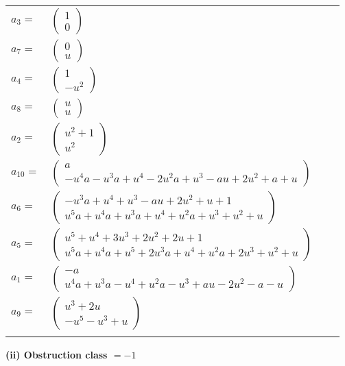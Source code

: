 \documentclass[1p]{elsarticle_modified}
\theoremstyle{definition}
\begin{document}
\begin{tabular}{m{7pt} m{180pt} m{7pt} m{180pt} }
\flushright $a_{3}=$&$\begin{pmatrix}1\\0\end{pmatrix}$ \\
\flushright $a_{7}=$&$\begin{pmatrix}0\\u\end{pmatrix}$ \\
\flushright $a_{4}=$&$\begin{pmatrix}1\\- u^2\end{pmatrix}$ \\
\flushright $a_{8}=$&$\begin{pmatrix}u\\u\end{pmatrix}$ \\
\flushright $a_{2}=$&$\begin{pmatrix}u^2+1\\u^2\end{pmatrix}$ \\
\flushright $a_{10}=$&$\begin{pmatrix}a\\- u^4 a- u^3 a+u^4-2 u^2 a+u^3- a u+2 u^2+a+u\end{pmatrix}$ \\
\flushright $a_{6}=$&$\begin{pmatrix}- u^3 a+u^4+u^3- a u+2 u^2+u+1\\u^5 a+u^4 a+u^3 a+u^4+u^2 a+u^3+u^2+u\end{pmatrix}$ \\
\flushright $a_{5}=$&$\begin{pmatrix}u^5+u^4+3 u^3+2 u^2+2 u+1\\u^5 a+u^4 a+u^5+2 u^3 a+u^4+u^2 a+2 u^3+u^2+u\end{pmatrix}$ \\
\flushright $a_{1}=$&$\begin{pmatrix}- a\\u^4 a+u^3 a- u^4+u^2 a- u^3+a u-2 u^2- a- u\end{pmatrix}$ \\
\flushright $a_{9}=$&$\begin{pmatrix}u^3+2 u\\- u^5- u^3+u\end{pmatrix}$\\&\end{tabular}
\flushleft \textbf{(ii) Obstruction class $= -1$}\\~\\
\end{document}
